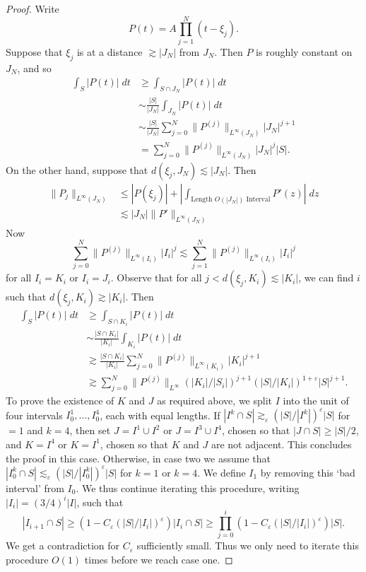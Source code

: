 \begin{proof}
    Write
    \[ P(t) = A \prod_{j = 1}^N (t - \xi_j). \]
    Suppose that $\xi_j$ is at a distance $\gtrsim |J_N|$ from $J_N$. Then $P$ is roughly constant on $J_N$, and so
    \begin{align*}
        \int_S |P(t)|\; dt &\geq \int_{S \cap J_N} |P(t)|\; dt\\
        &\sim \frac{|S|}{|J_N|} \int_{J_N} |P(t)|\; dt\\
        &\sim \frac{|S|}{|J_N|} \sum_{j = 0}^N \| P^{(j)} \|_{L^\infty(J_N)} |J_N|^{j+1}\\
        &= \sum_{j = 0}^N \| P^{(j)} \|_{L^\infty(J_N)} |J_N|^j |S|.
    \end{align*}
    On the other hand, suppose that $d(\xi_j, J_N) \lesssim |J_N|$. Then
    \begin{align*}
        \| P_j \|_{L^\infty(J_N)} &\leq |P(\xi_j)| + | \int_{\text{Length $O(|J_N|)$ Interval}} P'(z)|\; dz\\
        &\lesssim |J_N| \| P' \|_{L^\infty(J_N)} 
    \end{align*}
    Now
    \[ \sum_{j = 0}^N \| P^{(j)} \|_{L^\infty(I_i)} |I_i|^j \lesssim \sum_{j = 1}^N \| P^{(j)} \|_{L^\infty(I_i)} |I_i|^j \]
    for all $I_i = K_i$ or $I_i = J_i$. Observe that for all $j < d(\xi_j, K_i) \lesssim |K_i|$, we can find $i$ such that $d(\xi_j, K_i) \gtrsim |K_i|$. Then
    \begin{align*}
        \int_S |P(t)|\; dt &\geq \int_{S \cap K_i} |P(t)|\; dt\\
        &\sim \frac{|S \cap K_i|}{|K_i|} \int_{K_i} |P(t)|\; dt\\
        &\gtrsim \frac{|S \cap K_i|}{|K_i|} \sum_{j = 0}^N \| P^{(j)} \|_{L^\infty(K_i)} |K_i|^{j+1}\\
        &\gtrsim \sum_{j = 0}^N \| P^{(j)} \|_{L^\infty} ( |K_i| / |S_i| )^{j+1} ( |S| / |K_i| )^{1 + \varepsilon} |S|^{j+1}.
    \end{align*}
    To prove the existence of $K$ and $J$ as required above, we split $I$ into the unit of four intervals $I^1_0,\dots,I^4_0$, each with equal lengths. If $|I^k \cap S| \gtrsim_\varepsilon ( |S| / |I^k| )^\varepsilon |S|$ for $ = 1$ and $k = 4$, then set $J = I^1 \cup I^2$ or $J = I^3 \cup I^4$, chosen so that $|J \cap S| \geq |S| / 2$, and $K = I^4$ or $K = I^1$, chosen so that $K$ and $J$ are not adjacent. This concludes the proof in this case. Otherwise, in case two we assume that $|I_0^k \cap S| \lesssim_\varepsilon (|S| / |I_0^k|)^\varepsilon |S|$ for $k = 1$ or $k = 4$. We define $I_1$ by removing this `bad interval' from $I_0$. We thus continue iterating this procedure, writing $|I_i| = (3/4)^i |I|$, such that
    \[ |I_{i+1} \cap S| \geq (1 - C_\varepsilon (|S| / |I_i|)^\varepsilon) |I_i \cap S| \geq \prod_{j = 0}^i ( 1 - C_\varepsilon (|S| / |I_i|)^\varepsilon ) |S|. \]
    We get a contradiction for $C_\varepsilon$ sufficiently small. Thus we only need to iterate this procedure $O(1)$ times before we reach case one.
\end{proof}

